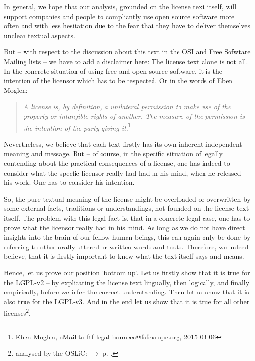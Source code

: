 In general, we hope that our analysis, grounded on the license text itself, will
support companies and people to compliantly use open source software more often
and with less hesitation due to the fear that they have to deliver themselves
unclear textual aspects.

But -- with respect to the discussion about this text in the OSI and Free
Sofwtare Mailing lists -- we have to add a disclaimer here: The license text
alone is not all. In the concrete situation of using free and open source
software, it is the intention of the licensor which has to be respected. Or in
the words of Eben Moglen:

\begin{quote}\noindent\emph{A license is, by definition, a unilateral permission
to make use of the property or intangible rights of another. The measure of the
permission is the intention of the party giving it.}\footnote{Eben
Moglen, eMail to ftf-legal-bounces@fsfeurope.org, 2015-03-06}\end{quote}

Nevertheless, we believe that each text firstly has its own inherent independent
meaning and message. But -- of course, in the specific situation of legally
contending about the practical consequences of a license, one has indeed to
consider what the specfic licensor really had had in his mind, when he released
his work. One has to consider his intention.

So, the pure textual meaning of the license might be overloaded or overwritten
by some external facts, traditions or understandings, not founded on the license
text itself. The problem with this legal fact is, that in a concrete legal case,
one has to prove what the licensor really had in his mind. As long as we do not
have direct insights into the brain of our fellow human beings, this can again
only be done by referring to other orally uttered or written words and texts.
Therefore, we indeed believe, that it is firstly important to know what the text
itself says and means.

Hence, let us prove our position 'bottom up'. Let us firstly show that it is
true for the LGPL-v2 -- by explicating the license text lingually, then
logically, and finally empirically, before we infer the correct understanding.
Then let us show that it is also true for the LGPL-v3. And in the end let us
show that it is true for all other licenses\footnote{analysed by the OSLiC:
$\rightarrow$ p. \pageref{RevEngOslicOsLisences}.}.

